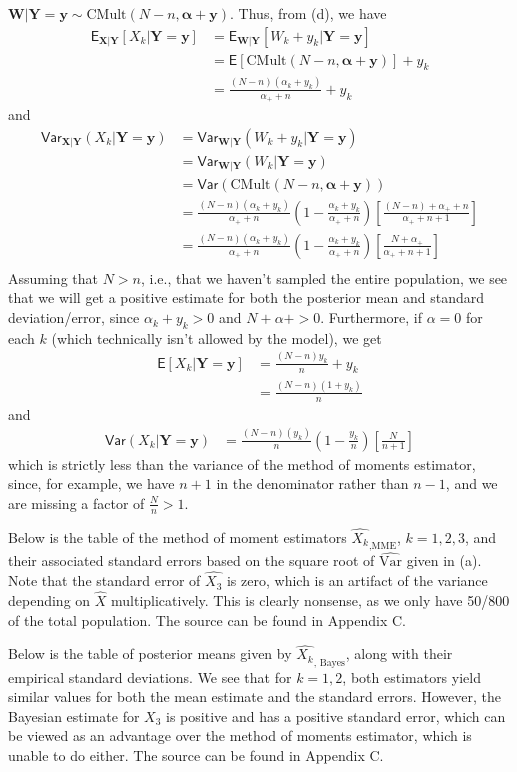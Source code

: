 \documentclass[11pt]{article}
\newcommand*\ba{\[ \begin{aligned}}
\newcommand*\ea{\end{aligned} \]}
\newcommand*\E[1]{\mathsf{E}\left[#1\right]}
\newcommand*\Esub[2]{\mathsf{E}_{#1}\left[#2\right]}
\newcommand*\Var[1]{\mathsf{Var}\left(#1\right)}
\newcommand*\estim[1]{\widehat{#1}}
\newcommand*\bW{\mathbf{W}}
\newcommand*\bX{\mathbf{X}}
\newcommand*\by{\mathbf{y}}
\newcommand*\bY{\mathbf{Y}}
\newcommand*\balpha{\boldsymbol{\alpha}}
\newcommand\Vsub[2]{\mathsf{Var}_{#1}\left(#2\right)}
\renewcommand\;{\,}
\begin{document}
$\bW | \bY = \by \sim \text{CMult}(N - n, \balpha + \by)$.
Thus, from (d), we have
\ba
\Esub{\bX | \bY}{ X_k | \bY = \by}
	& = \Esub{ \bW | \bY }{ W_k + y_k | \bY = \by } \\
	& = \E{ \text{CMult}(N - n, \balpha + \by) } + y_k \\
	& = \boxed{ \frac{(N - n) \left(\alpha_k + y_k \right)}{\alpha_+ + n} + y_k }
\ea
and
\ba
\Vsub{\bX | \bY}{ X_k | \bY = \by}
	& = \Vsub{\bW | \bY}{ W_k + y_k | \bY = \by} \\
	& = \Vsub{\bW | \bY}{ W_k | \bY = \by } \\
	& = \Var{ \text{CMult}(N - n, \balpha + \by) } \\
	& = \frac{(N - n) \left(\alpha_k + y_k \right)}{\alpha_+ + n} 
		\left( 1 - \frac{\alpha_k + y_k }{\alpha_+ + n} \right)
		\left[
		\frac{(N - n) + \alpha_+ + n} {\alpha_+ + n + 1}
		 \right] \\
	& = \boxed{  \frac{(N - n) \left(\alpha_k + y_k \right)}{\alpha_+ + n} 
		\left( 1 - \frac{\alpha_k + y_k }{\alpha_+ + n} \right)
		\left[
		\frac{N + \alpha_+ } {\alpha_+ + n + 1}
		 \right] } \\
\ea
Assuming that $N > n$, i.e., that we haven't sampled the entire population, we see that we will get a positive estimate for both the posterior mean and standard deviation/error, since $\alpha_k + y_k > 0$ and $N + \alpha+ > 0$. Furthermore, if
$\alpha = 0$ for each $k$ (which technically isn't allowed by the model), we get
\ba
\E{X_k | \bY = \by} & = \frac{(N - n) y_k }{ n } + y_k \\
	& = \frac{(N - n)(1 + y_k)}{n}
\ea   
and
\ba
\Var{X_k | \bY = \by} & = 
	 \frac{(N - n) \left( y_k \right)}{ n} 
		\left( 1 - \frac{ y_k }{ n} \right)
		\left[
		\frac{N  } { n + 1}
		 \right]
\ea
which is strictly less than the variance of the method of moments estimator, since, for example, we have $n + 1$ in the denominator rather than $n - 1$, and we are missing a factor of $\frac{N}{n} > 1$. 
\item
Below is the table of the method of moment estimators $\estim{X_k}_\text{,MME}$,
$k = 1, 2, 3$, and their associated standard errors based on the square root of
$\estim{\text{Var}}$ given in (a).
\\

Note that the standard error of $\estim{X_3}$ is zero, which is an artifact of the variance depending on $\estim{X}$ multiplicatively. This is clearly nonsense, as we only have 50/800 of the total population. The source can be found in Appendix C.
\item
Below is the table of posterior means given by $\estim{X_k}_\text{, Bayes}$, along with their empirical standard deviations. We see that for $k = 1, 2$, both estimators yield similar values for both the mean estimate and the standard errors. However, the Bayesian estimate for $X_3$ is positive and has a positive standard error, which can be viewed as an advantage over the method of moments estimator, which is unable to do either. The source can be found in Appendix C.
\end{document}
